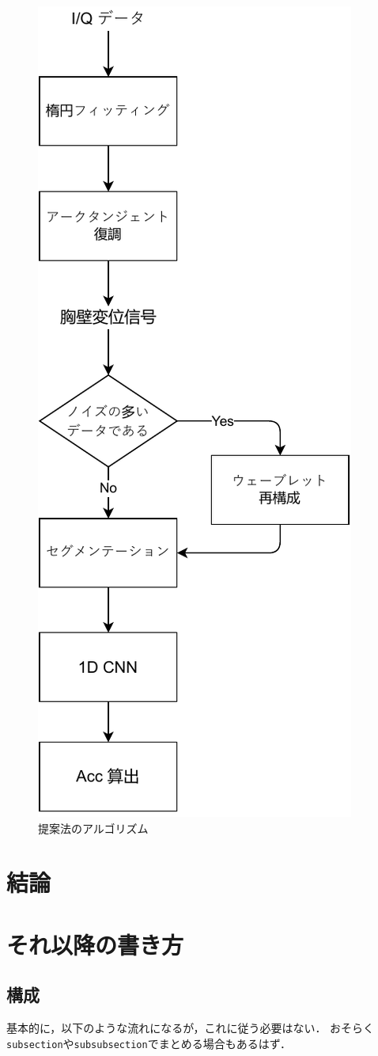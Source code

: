 \begin{figure}[H]
\begin{center}
\includegraphics[width=0.5\linewidth]{./fig/proposed_method.pdf}
\end{center}
\caption{提案法のアルゴリズム}
\label{fig:proposed_method}
\end{figure}

\chapter{結論}

\chapter{それ以降の書き方}
\section{構成}
基本的に，以下のような流れになるが，これに従う必要はない．
おそらく{\tt subsection}や{\tt subsubsection}でまとめる場合もあるはず．

